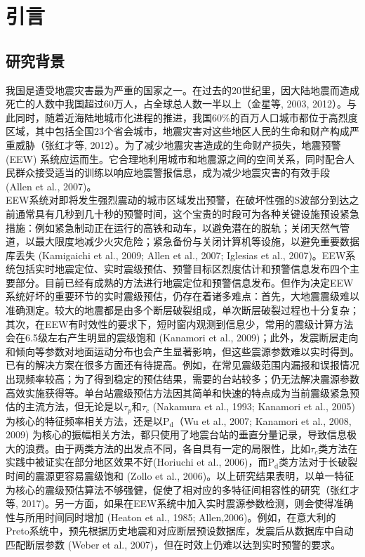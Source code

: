 
\chapter{引言}
\section{研究背景}
\indent 我国是遭受地震灾害最为严重的国家之一。在过去的20世纪里，因大陆地震而造成死亡的人数中我国超过60万人，占全球总人数一半以上（金星等, 2003, 2012）。与此同时，随着近海陆地城市化进程的推进，我国60\%的百万人口城市都位于高烈度区域，其中包括全国23个省会城市，地震灾害对这些地区人民的生命和财产构成严重威胁（张红才等, 2012）。为了减少地震灾害造成的生命财产损失，地震预警 (EEW) 系统应运而生。它合理地利用城市和地震源之间的空间关系，同时配合人民群众接受适当的训练以响应地震警报信息，成为减少地震灾害的有效手段 (Allen et al., 2007)。\\
\indent EEW系统对即将发生强烈震动的城市区域发出预警，在破坏性强的S波部分到达之前通常具有几秒到几十秒的预警时间，这个宝贵的时段可为各种关键设施预设紧急措施：例如紧急制动正在运行的高铁和动车，以避免潜在的脱轨；关闭天然气管道，以最大限度地减少火灾危险；紧急备份与关闭计算机等设施，以避免重要数据库丢失 (Kamigaichi et al., 2009; Allen et al., 2007; Iglesias et al., 2007)。EEW系统包括实时地震定位、实时震级预估、预警目标区烈度估计和预警信息发布四个主要部分。目前已经有成熟的方法进行地震定位和预警信息发布。但作为决定EEW系统好坏的重要环节的实时震级预估，仍存在着诸多难点：首先，大地震震级难以准确测定。较大的地震都是由多个断层破裂组成，单次断层破裂过程也十分复杂；其次，在EEW有时效性的要求下，短时窗内观测到信息少，常用的震级计算方法会在6.5级左右产生明显的震级饱和 (Kanamori et al., 2009)；此外，发震断层走向和倾向等参数对地面运动分布也会产生显著影响，但这些震源参数难以实时得到。\\
\indent 已有的解决方案在很多方面还有待提高。例如，在常见震级范围内漏报和误报情况出现频率较高；为了得到稳定的预估结果，需要的台站较多；仍无法解决震源参数高效实施获得等。单台站震级预估方法因其简单和快速的特点成为当前震级紧急预估的主流方法，但无论是以$\tau_{p}$和$\tau_{c}$ (Nakamura et al., 1993; Kanamori et al., 2005) 为核心的特征频率相关方法，还是以$\mathrm{P}_{\mathrm{d}}$（Wu et al., 2007; Kanamori et al., 2008, 2009) 为核心的振幅相关方法，都只使用了地震台站的垂直分量记录，导致信息极大的浪费。由于两类方法的出发点不同，各自具有一定的局限性，比如$\tau_{c}$类方法在实践中被证实在部分地区效果不好(Horiuchi et al., 2006)，而$\mathrm{P}_{\mathrm{d}}$类方法对于长破裂时间的震源更容易震级饱和 (Zollo et al., 2006)。以上研究结果表明，以单一特征为核心的震级预估算法不够强健，促使了相对应的多特征间相容性的研究（张红才等, 2017)。另一方面，如果在EEW系统中加入实时震源参数检测，则会使得准确性与所用时间同时增加 (Heaton et al., 1985; Allen,2006)。例如，在意大利的Preto系统中，预先根据历史地震和对应断层预设数据库，发震后从数据库中自动匹配断层参数 (Weber et al., 2007)，但在时效上仍难以达到实时预警的要求。\\
